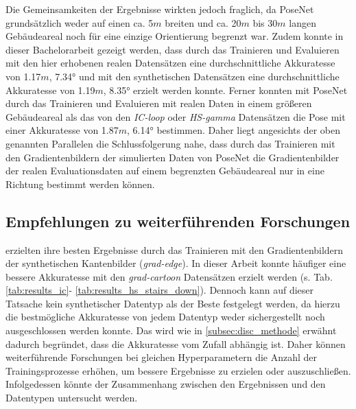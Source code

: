 Die Gemeinsamkeiten der Ergebnisse wirkten jedoch fraglich, da PoseNet grundsätzlich weder auf einen ca. 5$m$ breiten und ca. 20$m$ bis 30$m$ langen Gebäudeareal noch für eine einzige Orientierung begrenzt war. Zudem konnte in dieser Bachelorarbeit gezeigt werden, dass durch das Trainieren und Evaluieren mit den hier erhobenen realen Datensätzen eine durchschnittliche Akkuratesse von 1.17$m$, 7.34° und mit den synthetischen Datensätzen eine durchschnittliche Akkuratesse von 1.19$m$, 8.35° erzielt werden konnte. Ferner konnten \citet{walchImageBasedLocalizationUsing2017} mit PoseNet durch das Trainieren und Evaluieren mit realen Daten in einem größeren Gebäudeareal als das von den \textit{IC-loop} oder \textit{HS-gamma} Datensätzen die Pose mit einer Akkuratesse von 1.87$m$, 6.14° bestimmen. Daher liegt angesichts der oben genannten Parallelen die Schlussfolgerung nahe, dass durch das Trainieren mit den Gradientenbildern der simulierten Daten von PoseNet die Gradientenbilder der realen Evaluationsdaten auf einem begrenzten Gebäudeareal nur in eine Richtung bestimmt werden können.


\subsection{Empfehlungen zu weiterführenden Forschungen}

\citet{acharyaBIMPoseNetIndoorCamera2019} erzielten ihre besten Ergebnisse durch das Trainieren mit den Gradientenbildern der synthetischen Kantenbilder (\textit{grad-edge}). In dieser Arbeit konnte häufiger eine bessere Akkuratesse mit den \textit{grad-cartoon} Datensätzen erzielt werden (s. Tab. \ref{tab:results_ic}- \ref{tab:results_hs_stairs_down}). Dennoch kann auf dieser Tatsache kein synthetischer Datentyp als der Beste festgelegt werden, da hierzu die bestmögliche Akkuratesse von jedem Datentyp weder sichergestellt noch ausgeschlossen werden konnte. Das wird wie in \ref{subsec:disc_methode} erwähnt dadurch begründet, dass die Akkuratesse vom Zufall abhängig ist. Daher können weiterführende Forschungen bei gleichen Hyperparametern die Anzahl der Trainingsprozesse erhöhen, um bessere Ergebnisse zu erzielen oder auszuschließen. Infolgedessen könnte der Zusammenhang zwischen den Ergebnissen und den Datentypen untersucht werden. 


